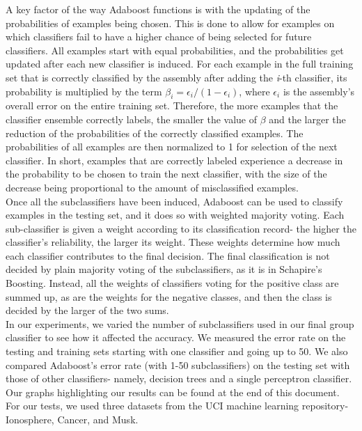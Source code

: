 \documentclass{article}
\begin{document}
A key factor of the way Adaboost functions is with the updating of the probabilities of examples being chosen. This is done to allow for examples on which classifiers fail to have a higher chance of being selected for future classifiers. All examples start with equal probabilities, and the probabilities get updated after each new classifier is induced. For each example in the full training set that is correctly classified by the assembly after adding the \textit{i}-th classifier, its probability is multiplied by the term $\beta_i = \epsilon_i / (1 - \epsilon_i)$, where $\epsilon_i$ is the assembly's overall error on the entire training set. Therefore, the more examples that the classifier ensemble correctly labels, the smaller the value of $\beta$ and the larger the reduction of the probabilities of the correctly classified examples. The probabilities of all examples are then normalized to 1 for selection of the next classifier. In short, examples that are correctly labeled experience a decrease in the probability to be chosen to train the next classifier, with the size of the decrease being proportional to the amount of misclassified examples. \\

Once all the subclassifiers have been induced, Adaboost can be used to classify examples in the testing set, and it does so with weighted majority voting. Each sub-classifier is given a weight according to its classification record- the higher the classifier's reliability, the larger its weight. These weights determine how much each classifier contributes to the final decision. The final classification is not decided by plain majority voting of the subclassifiers, as it is in Schapire's Boosting. Instead, all the weights of classifiers voting for the positive class are summed up, as are the weights for the negative classes, and then the class is decided by the larger of the two sums. \\

In our experiments, we varied the number of subclassifiers used in our final group classifier to see how it affected the accuracy. We measured the error rate on the testing and training sets starting with one classifier and going up to 50. We also compared Adaboost's error rate (with 1-50 subclassifiers) on the testing set with those of other classifiers- namely, decision trees and a single perceptron classifier. Our graphs highlighting our results can be found at the end of this document. For our tests, we used three datasets from the UCI machine learning repository- Ionosphere, Cancer, and Musk.
\end{document}
